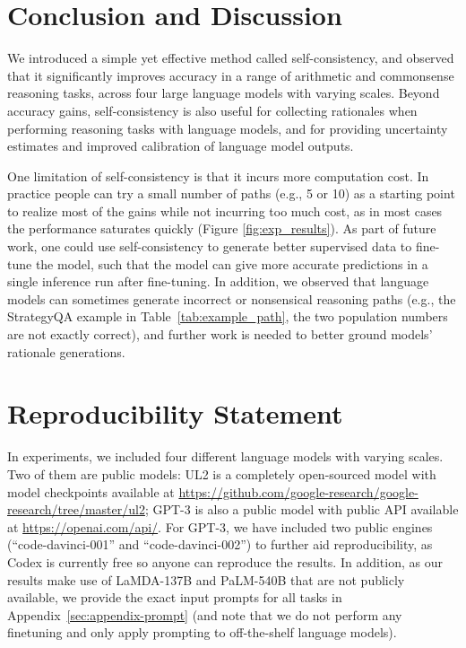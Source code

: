 \section{Conclusion and Discussion} We introduced a simple yet effective method called self-consistency, and observed that it significantly improves accuracy in a range of arithmetic and commonsense reasoning tasks, across four large language models with varying scales. Beyond accuracy gains, self-consistency is also useful for collecting rationales when performing reasoning tasks with language models, and for providing uncertainty estimates and improved calibration of language model outputs.

One limitation of self-consistency is that it incurs more computation cost. In practice people can try a small number of paths (e.g., 5 or 10) as a starting point to realize most of the gains while not incurring too much cost, as in most cases the performance saturates quickly (Figure \ref{fig:exp_results}). As part of future work, one could use self-consistency to generate better supervised data to fine-tune the model, such that the model can give more accurate predictions in a single inference run after fine-tuning. In addition, we observed that language models can sometimes generate incorrect or nonsensical reasoning paths (e.g., the StrategyQA example in Table~\ref{tab:example_path}, the two population numbers are not exactly correct), and further work is needed to better ground models' rationale generations.

\section*{Reproducibility Statement} In experiments, we included four different language models with varying scales. Two of them are public models: UL2 is a completely open-sourced model with model checkpoints available at \url{https://github.com/google-research/google-research/tree/master/ul2}; 
GPT-3 is also a public model with public API available at \url{https://openai.com/api/}. 
For GPT-3, we have included two public engines (``code-davinci-001'' and ``code-davinci-002'') to further aid reproducibility, as Codex is currently free so anyone can reproduce the results. In addition, as our results make use of LaMDA-137B and PaLM-540B that are not publicly available, we provide the exact input prompts for all tasks in Appendix~\ref{sec:appendix-prompt} (and note that we do not perform any finetuning and only apply prompting to off-the-shelf language models). 

